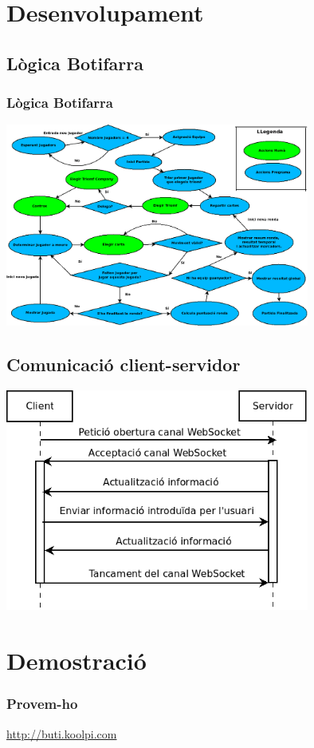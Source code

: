 \documentclass[notitlepage]{beamer}
\begin{document}
\section{Desenvolupament}
\subsection{Lògica Botifarra}
\begin{frame}
\frametitle{Lògica Botifarra}
\centering\includegraphics[width=10cm]{img/butifarra_workflow.png}
\end{frame}

\subsection{Comunicació client-servidor}
\begin{frame}
\centering\includegraphics[width=10cm]{img/diagrama-websocket.png}
\end{frame}

\section{Demostració}
\begin{frame}
\frametitle{Provem-ho}
\begin{center}
\url{http://buti.koolpi.com}
\end{center}
\end{frame}
\end{document}
